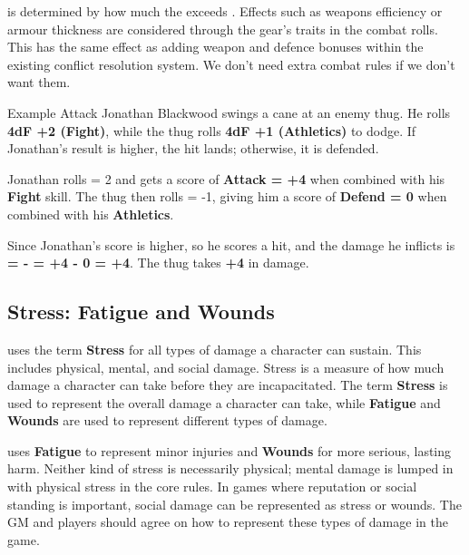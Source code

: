 \begin{multicols}{2}
\Damage is determined by how much the \Attack exceeds \Defend. Effects such as weapons efficiency or armour thickness are considered through the gear's traits in the combat rolls. This has the same effect as adding weapon and defence bonuses within the existing conflict resolution system. We don't need extra combat rules if we don't want them.

\begin{Example}{Example Attack}
	Jonathan Blackwood swings a cane at an enemy thug. He rolls \textbf{4dF +2 (Fight)}, while the thug rolls \textbf{4dF +1 (Athletics)} to dodge. If Jonathan’s result is higher, the hit lands; otherwise, it is defended.
	
	Jonathan rolls \FudgeRes{+++-} = 2 and gets a score of \textbf{Attack = +4} when combined with his \textbf{Fight} skill. The thug then rolls  = -1, giving him a score of \textbf{Defend = 0} when combined with his \textbf{Athletics}.
	
	Since Jonathan's score is higher, so he scores a hit, and the damage he inflicts is \textbf{\Damage = \Attack - \Defend = +4 - 0 = +4}. The thug takes \textbf{+4} in damage.
\end{Example}


\subsection{Stress: Fatigue  and Wounds}

\wyrd uses the term \textbf{Stress} for all types of damage a character can sustain. This includes physical, mental, and social damage. Stress is a measure of how much damage a character can take before they are incapacitated. The term \textbf{Stress} is used to represent the overall damage a character can take, while \textbf{Fatigue} and \textbf{Wounds} are used to represent different types of damage.

\wyrd uses \textbf{Fatigue} to represent minor injuries and \textbf{Wounds} for more serious, lasting harm. Neither kind of stress is necessarily physical; mental damage is lumped in with physical stress in the core rules. In games where reputation or social standing is important, social damage can be represented as stress or wounds. The GM and players should agree on how to represent these types of damage in the game.


\end{multicols}
